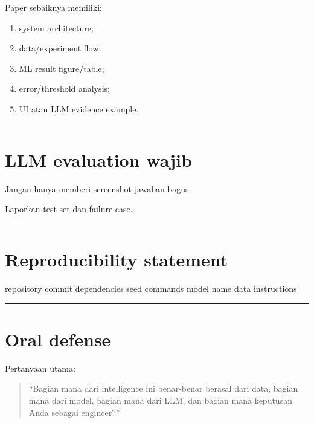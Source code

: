 \documentclass[
  indonesian,
  letterpaper,
  DIV=11,
  numbers=noendperiod]{scrreprt}
\newenvironment{Shaded}{\begin{snugshade}}{\end{snugshade}}
\newcommand{\NormalTok}[1]{\textcolor[rgb]{0.00,0.23,0.31}{#1}}
\providecommand{\tightlist}{%
  \setlength{\itemsep}{0pt}\setlength{\parskip}{0pt}}
\begin{document}
Paper sebaiknya memiliki:

\begin{enumerate}
\def\labelenumi{\arabic{enumi}.}
\tightlist
\item
  system architecture;
\item
  data/experiment flow;
\item
  ML result figure/table;
\item
  error/threshold analysis;
\item
  UI atau LLM evidence example.
\end{enumerate}

\begin{center}\rule{0.5\linewidth}{0.5pt}\end{center}

\section{LLM evaluation wajib}\label{llm-evaluation-wajib}

Jangan hanya memberi screenshot jawaban bagus.

Laporkan test set dan failure case.

\begin{center}\rule{0.5\linewidth}{0.5pt}\end{center}

\section{Reproducibility statement}\label{reproducibility-statement}

\begin{Shaded}
\begin{Highlighting}[]
\NormalTok{repository}
\NormalTok{commit}
\NormalTok{dependencies}
\NormalTok{seed}
\NormalTok{commands}
\NormalTok{model name}
\NormalTok{data instructions}
\end{Highlighting}
\end{Shaded}

\begin{center}\rule{0.5\linewidth}{0.5pt}\end{center}

\section{Oral defense}\label{oral-defense}

Pertanyaan utama:

\begin{quote}
``Bagian mana dari intelligence ini benar-benar berasal dari data,
bagian mana dari model, bagian mana dari LLM, dan bagian mana keputusan
Anda sebagai engineer?''
\end{quote}
\end{document}
